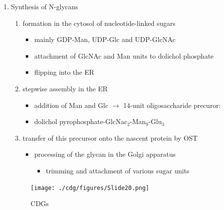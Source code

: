 \documentclass{scrartcl}
\begin{document}
\begin{enumerate}
\item Synthesis of N-glycans
\label{sec:org9214728}
\begin{enumerate}
\item formation in the cytosol of nucleotide-linked sugars
\begin{itemize}
\item mainly GDP-Man, UDP-Glc and UDP-GlcNAc
\item attachment of GlcNAc and Man units to dolichol phosphate
\item flipping into the ER
\end{itemize}
\item stepwise assembly in the ER
\begin{itemize}
\item addition of Man and Glc \(\to\) 14-unit oligosaccharide precuror:
\item dolichol pyrophosphate-GlcNac\(_{\text{2}}\)-Man\(_{\text{9}}\)-Glu\(_{\text{3}}\)
\end{itemize}
\item transfer of this precursor onto the nascent protein by OST
\begin{itemize}
\item processing of the glycan in the Golgi apparatus
\begin{itemize}
\item trimming and attachment of various sugar units
\end{itemize}
\end{itemize}
\end{enumerate}

\begin{figure}[htbp]
\centering
\texttt{[image: ./cdg/figures/Slide20.png]}
\caption{\label{fig:org0d2bc31}
CDGs}
\end{figure}


\end{enumerate}
\end{document}
